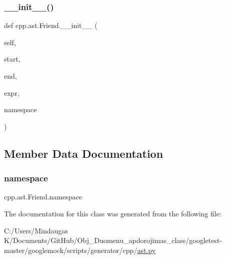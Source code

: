 \subsubsection{\texorpdfstring{\_\_init\_\_()}{\_\_init\_\_()}}
{\footnotesize\ttfamily def cpp.\+ast.\+Friend.\+\_\+\+\_\+init\+\_\+\+\_\+ (\begin{DoxyParamCaption}\item[{}]{self,  }\item[{}]{start,  }\item[{}]{end,  }\item[{}]{expr,  }\item[{}]{namespace }\end{DoxyParamCaption})}



\subsection{Member Data Documentation}
\mbox{\label{classcpp_1_1ast_1_1_friend_a076c68dddae9bd1e24d224d005538014}} 
\subsubsection{\texorpdfstring{namespace}{namespace}}
{\footnotesize\ttfamily cpp.\+ast.\+Friend.\+namespace}



The documentation for this class was generated from the following file\+:\begin{DoxyCompactItemize}
\item 
C\+:/\+Users/\+Mindaugas K/\+Documents/\+Git\+Hub/\+Obj\+\_\+\+Duomenu\+\_\+apdorojimas\+\_\+class/googletest-\/master/googlemock/scripts/generator/cpp/\mbox{\hyperlink{googletest-master_2googlemock_2scripts_2generator_2cpp_2ast_8py}{ast.\+py}}\end{DoxyCompactItemize}
